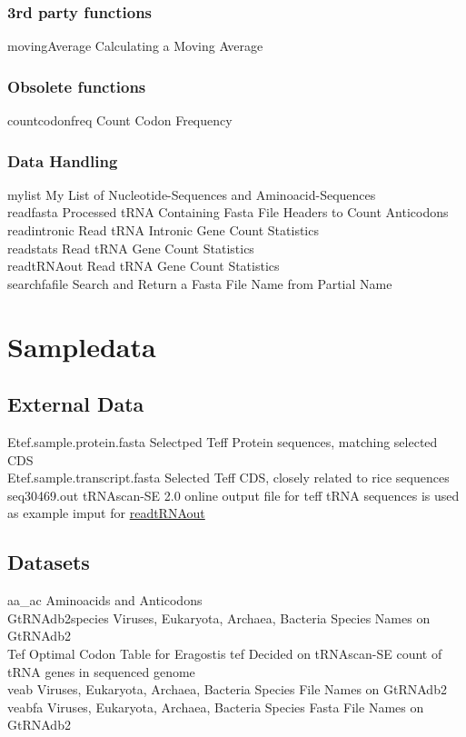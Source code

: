 \subsubsection{3rd party functions}
movingAverage	\quad Calculating a Moving Average \\

\subsubsection{Obsolete functions}
countcodonfreq	\quad Count Codon Frequency \\

\subsubsection{Data Handling}
mylist	\quad My List of Nucleotide-Sequences and Aminoacid-Sequences \\
readfasta	\quad Processed tRNA Containing Fasta File Headers to Count Anticodons \\
readintronic	\quad Read tRNA Intronic Gene Count Statistics \\
readstats	\quad Read tRNA Gene Count Statistics \\
\hypertarget{function:rtRNAo}{readtRNAout}	\quad Read tRNA Gene Count Statistics \\
searchfafile	\quad Search and Return a Fasta File Name from Partial Name \\

\section{Sampledata}

\subsection{External Data}
Etef.sample.protein.fasta \quad Selectped Teff Protein sequences, matching selected CDS \\
Etef.sample.transcript.fasta \quad  Selected Teff CDS, closely related to rice sequences \\
seq30469.out \quad tRNAscan-SE 2.0 online output file for teff tRNA sequences is used as example imput for \hyperlink{function:rtRNAo}{readtRNAout} \\

\subsection{Datasets}
aa\_ac	\quad Aminoacids and Anticodons \\
GtRNAdb2species	\quad Viruses, Eukaryota, Archaea, Bacteria Species Names on GtRNAdb2 \\
Tef	\quad Optimal Codon Table for Eragostis tef Decided on tRNAscan-SE count of tRNA genes in sequenced genome \\
veab		\quad Viruses, Eukaryota, Archaea, Bacteria Species File Names on GtRNAdb2 \\
veabfa	\quad Viruses, Eukaryota, Archaea, Bacteria Species Fasta File Names on GtRNAdb2 \\




